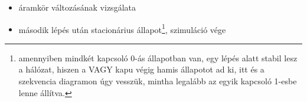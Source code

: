 {\begin{itemize}
\begin{itemize}
\begin{itemize}
\item egyik kapcsoló kiértékelése (állapotának kijelzése)
\item másik kapcsoló kiértékelése (állapotának kijelzése)
\item VAGY kapu kiértékelése
\begin{itemize}
\setlength{\itemsep}{0cm}%
\setlength{\parskip}{0cm}%
\item bemenetén lévő értékek lekérése
\item kimenetére kötött érték kiszámolása és kiadása
\end{itemize}
\item led kiértékelése (világít/nem világít kijelzése)
\end{itemize}
\item áramkör változásának vizsgálata
\item második lépés után stacionárius állapot\footnote{amennyiben mindkét kapcsoló 0-ás állapotban van, egy lépés alatt stabil lesz a hálózat, hiszen a VAGY kapu végig hamis állapotot ad ki, itt és a szekvencia diagramon úgy vesszük, mintha legalább az egyik kapcsoló 1-esbe lenne állítva.}, szimuláció vége
\end{itemize}
\end{itemize}
\vspace{-15pt}}

\newpage

